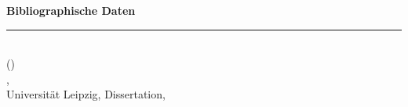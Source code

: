 \begin{flushleft}{\bf Bibliographische Daten} \\\rule{120mm}{0.5mm}\end{flushleft}
\mytitle \\
(\mytitleDE)\\
\melast, \mefirst\\
Universit\"at Leipzig, Dissertation, \year \\

